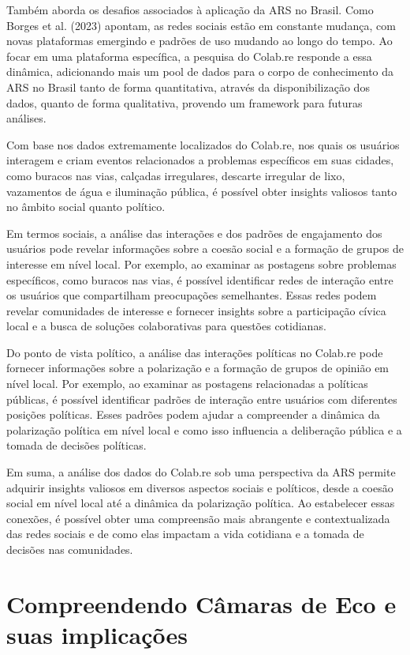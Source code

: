Também aborda os desafios associados à aplicação da ARS no Brasil. Como Borges et al. (2023) apontam, as redes sociais estão em constante mudança, com novas plataformas emergindo e padrões de uso mudando ao longo do tempo. Ao focar em uma plataforma específica, a pesquisa do Colab.re responde a essa dinâmica, adicionando mais um pool de dados para o corpo de conhecimento da ARS no Brasil tanto de forma quantitativa, através da disponibilização dos dados, quanto de forma qualitativa, provendo um framework para futuras análises.

Com base nos dados extremamente localizados do Colab.re, nos quais os usuários interagem e criam eventos relacionados a problemas específicos em suas cidades, como buracos nas vias, calçadas irregulares, descarte irregular de lixo, vazamentos de água e iluminação pública, é possível obter insights valiosos tanto no âmbito social quanto político.

Em termos sociais, a análise das interações e dos padrões de engajamento dos usuários pode revelar informações sobre a coesão social e a formação de grupos de interesse em nível local. Por exemplo, ao examinar as postagens sobre problemas específicos, como buracos nas vias, é possível identificar redes de interação entre os usuários que compartilham preocupações semelhantes. Essas redes podem revelar comunidades de interesse e fornecer insights sobre a participação cívica local e a busca de soluções colaborativas para questões cotidianas.

Do ponto de vista político, a análise das interações políticas no Colab.re pode fornecer informações sobre a polarização e a formação de grupos de opinião em nível local. Por exemplo, ao examinar as postagens relacionadas a políticas públicas, é possível identificar padrões de interação entre usuários com diferentes posições políticas. Esses padrões podem ajudar a compreender a dinâmica da polarização política em nível local e como isso influencia a deliberação pública e a tomada de decisões políticas.

Em suma, a análise dos dados do Colab.re sob uma perspectiva da ARS permite adquirir insights valiosos em diversos aspectos sociais e políticos, desde a coesão social em nível local até a dinâmica da polarização política. Ao estabelecer essas conexões, é possível obter uma compreensão mais abrangente e contextualizada das redes sociais e de como elas impactam a vida cotidiana e a tomada de decisões nas comunidades.

\section{Compreendendo Câmaras de Eco e suas implicações}
\label{05_echochambers}

